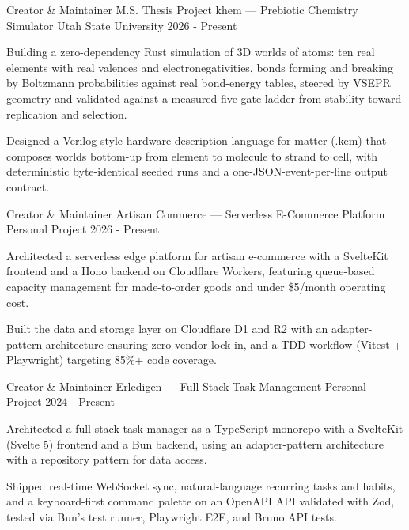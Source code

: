 \documentclass[11pt, letterpaper]{awesome-cv}
\begin{document}
\begin{cventries}

  \cventry
    {Creator \& Maintainer {\enskip\cdotp\enskip} M.S. Thesis Project}
    {khem --- Prebiotic Chemistry Simulator}
    {Utah State University}
    {2026 - Present}
    {
      \begin{cvitems}
        \item {Building a zero-dependency Rust simulation of 3D worlds of atoms: ten real elements with real valences and electronegativities, bonds forming and breaking by Boltzmann probabilities against real bond-energy tables, steered by VSEPR geometry and validated against a measured five-gate ladder from stability toward replication and selection.}
        \item {Designed a Verilog-style hardware description language for matter (.kem) that composes worlds bottom-up from element to molecule to strand to cell, with deterministic byte-identical seeded runs and a one-JSON-event-per-line output contract.}
      \end{cvitems}
    }

  \cventry
    {Creator \& Maintainer}
    {Artisan Commerce --- Serverless E-Commerce Platform}
    {Personal Project}
    {2026 - Present}
    {
      \begin{cvitems}
        \item {Architected a serverless edge platform for artisan e-commerce with a SvelteKit frontend and a Hono backend on Cloudflare Workers, featuring queue-based capacity management for made-to-order goods and under \$5/month operating cost.}
        \item {Built the data and storage layer on Cloudflare D1 and R2 with an adapter-pattern architecture ensuring zero vendor lock-in, and a TDD workflow (Vitest + Playwright) targeting 85\%+ code coverage.}
      \end{cvitems}
    }

  \cventry
    {Creator \& Maintainer}
    {Erledigen --- Full-Stack Task Management}
    {Personal Project}
    {2024 - Present}
    {
      \begin{cvitems}
        \item {Architected a full-stack task manager as a TypeScript monorepo with a SvelteKit (Svelte 5) frontend and a Bun backend, using an adapter-pattern architecture with a repository pattern for data access.}
        \item {Shipped real-time WebSocket sync, natural-language recurring tasks and habits, and a keyboard-first command palette on an OpenAPI API validated with Zod, tested via Bun's test runner, Playwright E2E, and Bruno API tests.}
      \end{cvitems}
    }


\end{cventries}
\end{document}
